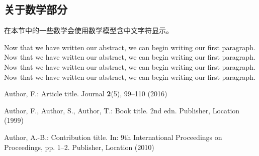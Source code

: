 \documentclass[a4paper, 11pt]{article}
\begin{document}
\begin{CJK*}{UTF8}{gbsn}
    \section{关于数学部分}
    在本节中的一些数学会使用数学模型含中文字符显示。
    
    \vspace{0.5cm} %
    
    Now that we have written our abstract, we can begin writing our first paragraph.
    Now that we have written our abstract, we can begin writing our first paragraph.
    Now that we have written our abstract, we can begin writing our first paragraph.
    Now that we have written our abstract, we can begin writing our first paragraph.
    
    \vspace{0.5cm}
    
    \newpage
    \begin{thebibliography}{8}
    Author, F.: Article title. Journal \textbf{2}(5), 99--110 (2016)
    
    
    Author, F., Author, S., Author, T.: Book title. 2nd edn. Publisher,
    Location (1999)
    
    Author, A.-B.: Contribution title. In: 9th International Proceedings
    on Proceedings, pp. 1--2. Publisher, Location (2010)
    
    \end{thebibliography}
    
    \end{CJK*}
    

    
    
    
\end{document}
